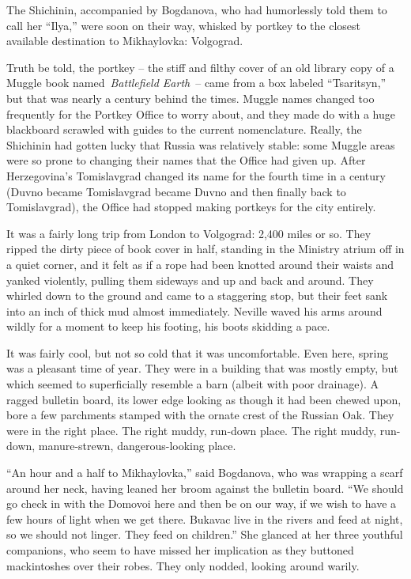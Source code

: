 The Shichinin, accompanied by Bogdanova, who had humorlessly told them
to call her ``Ilya,'' were soon on their way, whisked by portkey to the
closest available destination to Mikhaylovka: Volgograd.

Truth be told, the portkey -- the stiff and filthy cover of an old
library copy of a Muggle book named~\emph{Battlefield Earth}~-- came
from a box labeled ``Tsaritsyn,'' but that was nearly a century behind
the times. Muggle names changed too frequently for the Portkey Office to
worry about, and they made do with a huge blackboard scrawled with
guides to the current nomenclature. Really, the Shichinin had gotten
lucky that Russia was relatively stable: some Muggle areas were so prone
to changing their names that the Office had given up. After
Herzegovina's Tomislavgrad changed its name for the fourth time in a
century (Duvno became Tomislavgrad became Duvno and then finally back to
Tomislavgrad), the Office had stopped making portkeys for the city
entirely.

It was a fairly long trip from London to Volgograd: 2,400 miles or so.
They ripped the dirty piece of book cover in half, standing in the
Ministry atrium off in a quiet corner, and it felt as if a rope had been
knotted around their waists and yanked violently, pulling them sideways
and up and back and around. They whirled down to the ground and came to
a staggering stop, but their feet sank into an inch of thick mud almost
immediately. Neville waved his arms around wildly for a moment to keep
his footing, his boots skidding a pace.

It was fairly cool, but not so cold that it was uncomfortable. Even
here, spring was a pleasant time of year. They were in a building that
was mostly empty, but which seemed to superficially resemble a barn
(albeit with poor drainage). A ragged bulletin board, its lower edge
looking as though it had been chewed upon, bore a few parchments stamped
with the ornate crest of the Russian Oak. They were in the right place.
The right muddy, run-down place. The right muddy, run-down,
manure-strewn, dangerous-looking place.

``An hour and a half to Mikhaylovka,'' said Bogdanova, who was wrapping
a scarf around her neck, having leaned her broom against the bulletin
board. ``We should go check in with the Domovoi here and then be on our
way, if we wish to have a few hours of light when we get there. Bukavac
live in the rivers and feed at night, so we should not linger. They feed
on children.'' She glanced at her three youthful companions, who seem to
have missed her implication as they buttoned mackintoshes over their
robes. They only nodded, looking around warily.

